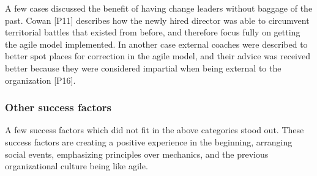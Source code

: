 
A few cases discussed the benefit of having change leaders without baggage of
the past. Cowan [P11] describes how the newly hired director was able to
circumvent territorial battles that existed from before, and therefore focus
fully on getting the agile model implemented. In another case external coaches
were described to better spot places for correction in the agile model, and
their advice was received better because they were considered impartial when
being external to the organization [P16].


% 
% 
% 
% 
% 


\subsubsection{Other success factors}

A few success factors which did not fit in the above categories stood out. These
success factors are creating a positive experience in the beginning, arranging
social events, emphasizing principles over mechanics, and the previous
organizational culture being like agile.


